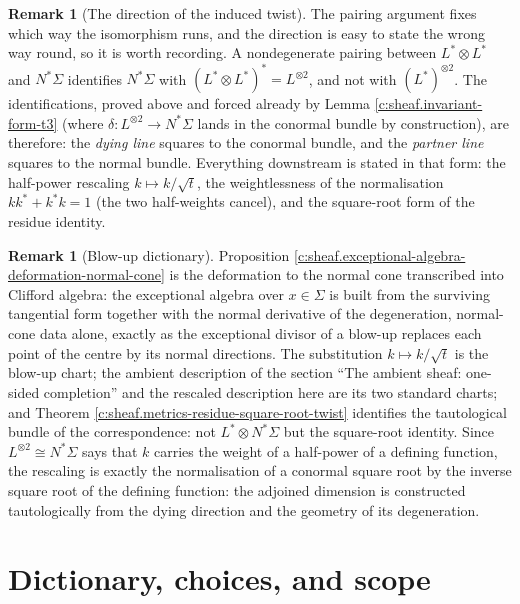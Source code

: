 \documentclass[11pt]{article}
\theoremstyle{definition}
\newtheorem{remark}[theorem]{Remark}
\theoremstyle{plain}
\providecommand{\Sig}{}\renewcommand{\Sig}{\Sigma}
\providecommand{\shL}{}\renewcommand{\shL}{L}
\begin{document}
\begin{remark}[The direction of the induced twist]\label{c:note.sheaf.direction-induced-twist}
The pairing argument fixes which way the isomorphism runs, and the direction is easy to state the wrong way round, so it is worth recording. A nondegenerate pairing between $\shL^* \otimes \shL^*$ and $N^*\Sig$ identifies $N^*\Sig$ with $(\shL^* \otimes \shL^*)^* = \shL^{\otimes 2}$, and not with $(\shL^*)^{\otimes 2}$. The identifications, proved above and forced already by Lemma \ref{c:sheaf.invariant-form-t3} (where $\delta : \shL^{\otimes 2} \to N^*\Sig$ lands in the conormal bundle by construction), are therefore: the \emph{dying line} squares to the conormal bundle, and the \emph{partner line} squares to the normal bundle. Everything downstream is stated in that form: the half-power rescaling $k \mapsto k/\sqrt t$, the weightlessness of the normalisation $kk^* + k^*k = 1$ (the two half-weights cancel), and the square-root form of the residue identity.
\end{remark}

\begin{remark}[Blow-up dictionary]\label{c:note.sheaf.blow-up-dictionary}
Proposition \ref{c:sheaf.exceptional-algebra-deformation-normal-cone} is the deformation to the normal cone \cite[Ch.~5]{Fulton1998} transcribed into Clifford algebra: the exceptional algebra over $x \in \Sig$ is built from the surviving tangential form together with the normal derivative of the degeneration, normal-cone data alone, exactly as the exceptional divisor of a blow-up replaces each point of the centre by its normal directions. The substitution $k \mapsto k/\sqrt{t}$ is the blow-up chart; the ambient description of the section ``The ambient sheaf: one-sided completion'' and the rescaled description here are its two standard charts; and Theorem \ref{c:sheaf.metrics-residue-square-root-twist} identifies the tautological bundle of the correspondence: not $\shL^* \otimes N^*\Sig$ but the square-root identity. Since $\shL^{\otimes 2} \cong N^*\Sig$ says that $k$ carries the weight of a half-power of a defining function, the rescaling is exactly the normalisation of a conormal square root by the inverse square root of the defining function: the adjoined dimension is constructed tautologically from the dying direction and the geometry of its degeneration.
\end{remark}

\section{Dictionary, choices, and scope}
\end{document}
